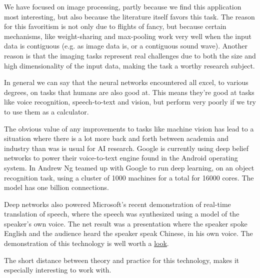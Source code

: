 \documentclass[11pt]{article}
\begin{document}
We have focused on image processing, partly because we find this application most interesting, but also because the literature itself favors this task.  The reason for this favoritism is not only due to flights of fancy, but because certain mechanisms, like weight-sharing and max-pooling work very well when the input data is contiguous (e.g. as image data is, or a contiguous sound wave).  Another reason is that the imaging tasks represent real challenges due to both the size and high dimensionality of the input data, making the task a worthy research subject.

In general we can say that the neural networks encountered all excel, to various degrees, on tasks that humans are also good at.  This means they're good at tasks like voice recognition, speech-to-text and vision, but perform very poorly if we try to use them as a calculator.

The obvious value of any improvements to tasks like machine vision has lead to a situation where there is a lot more back and forth between academia and industry than was is usual for AI research.  Google is currently using deep belief networks to power their voice-to-text engine found in the Android operating system.  In \cite{ng} Andrew Ng teamed up with Google to run deep learning, on an object recognition task, using a cluster of 1000 machines for a total for 16000 cores.  The model has one billion connections.

Deep networks also powered Microsoft's recent demonstration of real-time translation of speech, where the speech was synthesized using a model of the speaker's own voice.  The net result was a presentation where the speaker spoke English and the audience heard the speaker speak Chinese, in his own voice.  The demonstration of this technology is well worth a \href{http://www.youtube.com/watch?v=Nu-nlQqFCKg}{look}.

The short distance between theory and practice for this technology, makes it especially interesting to work with.



\end{document}

